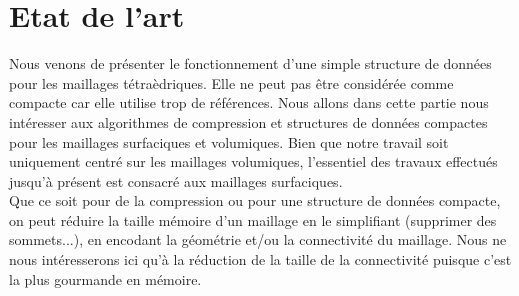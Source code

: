 \section{Etat de l'art}
\noindent
Nous venons de présenter le fonctionnement d'une simple structure de données pour les maillages tétraèdriques. Elle ne peut pas être considérée comme compacte car elle utilise trop de références. Nous allons dans cette partie nous intéresser aux algorithmes de compression et structures de données compactes pour les maillages surfaciques et volumiques. Bien que notre travail soit uniquement centré sur les maillages volumiques, l'essentiel des travaux effectués jusqu'à présent est consacré aux maillages surfaciques.\\
Que ce soit pour de la compression ou pour une structure de données compacte, on peut réduire la taille mémoire d'un maillage en le simplifiant (supprimer des sommets...), en encodant la géométrie et/ou la connectivité du maillage. Nous ne nous intéresserons ici qu'à la réduction de la taille de la connectivité puisque c'est la plus gourmande en mémoire.\\
